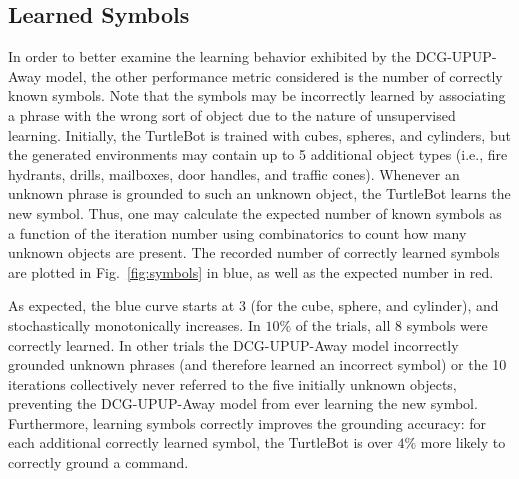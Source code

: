 \subsection{Learned Symbols}
In order to better examine the learning behavior exhibited by the DCG-UPUP-Away model, the other performance metric considered is the number of correctly known symbols. Note that the symbols may be incorrectly learned by associating a phrase with the wrong sort of object due to the nature of unsupervised learning.
Initially, the TurtleBot is trained with cubes, spheres, and cylinders, but the generated environments may contain up to 5 additional object types (i.e., fire hydrants, drills, mailboxes, door handles, and traffic cones).
Whenever an unknown phrase is grounded to such an unknown object, the TurtleBot learns the new symbol.
Thus, one may calculate the expected number of known symbols as a function of the iteration number using combinatorics to count how many unknown objects are present.
The recorded number of correctly learned symbols are plotted in Fig.~\ref{fig:symbols} in blue, as well as the expected number in red.

As expected, the blue curve starts at $3$ (for the cube, sphere, and cylinder), and stochastically monotonically increases.
In $10\%$ of the trials, all $8$ symbols were correctly learned. In other trials the DCG-UPUP-Away model incorrectly grounded unknown phrases (and therefore learned an incorrect symbol) or the 10 iterations collectively never referred to the five initially unknown objects, preventing the DCG-UPUP-Away model from ever learning the new symbol.
Furthermore, learning symbols correctly improves the grounding accuracy: for each additional correctly learned symbol, the TurtleBot is over $4\%$ more likely to correctly ground a command. %

